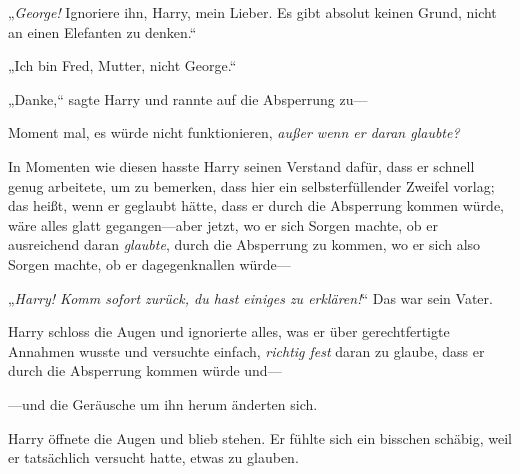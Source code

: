 „\emph{George!} Ignoriere ihn, Harry, mein Lieber. Es gibt absolut keinen Grund, nicht an einen Elefanten zu denken.“

„Ich bin Fred, Mutter, nicht George.“

„Danke,“ sagte Harry und rannte auf die Absperrung zu—

Moment mal, es würde nicht funktionieren, \emph{außer wenn er daran glaubte?}

In Momenten wie diesen hasste Harry seinen Verstand dafür, dass er schnell genug arbeitete, um zu bemerken, dass hier ein selbsterfüllender Zweifel vorlag; das heißt, wenn er geglaubt hätte, dass er durch die Absperrung kommen würde, wäre alles glatt gegangen—aber jetzt, wo er sich Sorgen machte, ob er ausreichend daran \emph{glaubte}, durch die Absperrung zu kommen, wo er sich also Sorgen machte, ob er dagegenknallen würde—

„\emph{Harry! Komm sofort zurück, du hast einiges zu erklären!}“ Das war sein Vater.

Harry schloss die Augen und ignorierte alles, was er über gerechtfertigte Annahmen wusste und versuchte einfach, \emph{richtig fest} daran zu glaube, dass er durch die Absperrung kommen würde und—

—und die Geräusche um ihn herum änderten sich.

Harry öffnete die Augen und blieb stehen. Er fühlte sich ein bisschen schäbig, weil er tatsächlich versucht hatte, etwas zu glauben.

